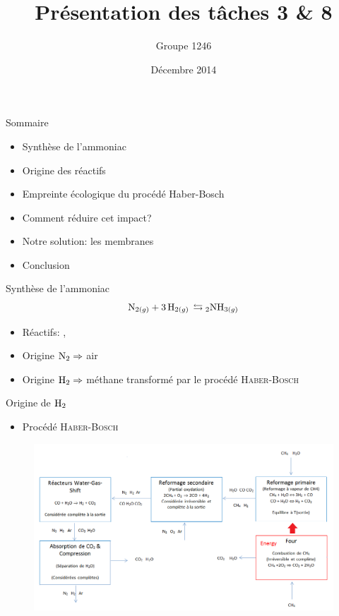 \documentclass{beamer}
\title{Présentation des tâches 3 \& 8 }
\author{Groupe 1246}
\institute{École Polytechnique de Louvain}
\date{Décembre 2014}
\begin{document}
\begin{frame}{}
\maketitle
\end{frame}

\begin{frame}{Sommaire}
\begin{itemize}
\item {Synthèse de l'ammoniac}
\item {Origine des réactifs}
\item {Empreinte écologique du procédé Haber-Bosch}
\item {Comment réduire cet impact?}
\item {Notre solution: les membranes}
\item {Conclusion}
\end{itemize}
\end{frame}

\begin{frame}{Synthèse de l'ammoniac}
$$\ce{N_{2(g)} + 3H_{2(g)} \leftrightarrows 2NH_{3(g)}}$$
\begin{itemize}
\item{Réactifs: , }
\item{Origine $\ce{N_2} \Rightarrow$ air}
\item{Origine $\ce{H_2} \Rightarrow$ méthane transformé par le procédé \textsc{Haber-Bosch} }
\end{itemize}
\end{frame}

\begin{frame}{Origine de $\ce{H_2}$}
\begin{itemize}
\item{Procédé \textsc{Haber-Bosch}}
\end{itemize}
\begin{figure}[ht!]
\centering
\includegraphics[scale=0.35]{PrHB2.png}
\label{scheme}
\end{figure}
\end{frame}
\end{document}
